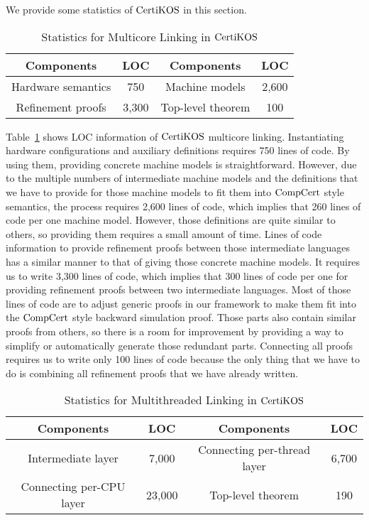 We provide some statistics of $\mathrm{CertiKOS}$ in this section. 
\begin{table}
\begin{center}
\renewcommand{\arraystretch}{1.1}
\setlength{\tabcolsep}{0.3em}
\begin{tabular}{|c|c||c|c|}
\hline
Components  & LOC & Components  & LOC \\
\hline
\hline
Hardware semantics & 750 &
Machine models & 2,600 \\ 
\hline
Refinement proofs & 3,300 & Top-level theorem & 100\\ 
\hline
\end{tabular}
\end{center}
\caption{Statistics for Multicore Linking in $\mathrm{CertiKOS}$}
\label{table:multicore-evaluation}
\hrulefill
\end{table}
Table~\ref{table:multicore-evaluation} shows LOC information of $\mathrm{CertiKOS}$ multicore linking.
Instantiating hardware configurations and auxiliary definitions requires 750 lines of code. 
By using them, providing concrete machine models is straightforward.
However, due to the multiple numbers of intermediate machine models and the definitions that we have to provide for those machine models to fit them into $\mathrm{CompCert}$ style semantics, the process requires 2,600 lines of code, which implies that 260 lines of code per one machine model.
However, those definitions are quite similar to others, so providing them requires a small amount of time. 
Lines of code information to provide refinement proofs between those intermediate languages has a similar manner to that of giving those concrete machine models. 
It requires us to write 3,300 lines of code, which implies that 300 lines of code per one for providing refinement proofs between two intermediate languages. 
Most of those lines of code are to adjust generic proofs in our framework to make them fit into the $\mathrm{CompCert}$ style backward simulation proof. 
Those parts also contain similar proofs from others, so there is a room for improvement by providing a way to simplify or automatically generate those redundant parts. 
Connecting all proofs requires us to write only 100 lines of code because the only thing that we have to do is combining all refinement proofs that we have already written. 
\begin{table}
\begin{center}
\renewcommand{\arraystretch}{1.1}
\setlength{\tabcolsep}{0.3em}
\begin{tabular}{|c|c||c|c|}
\hline
Components  & LOC & Components  & LOC \\
\hline
\hline
Intermediate layer & 7,000 &
Connecting per-thread layer & 6,700 \\ 
\hline
Connecting per-CPU layer & 23,000 & Top-level theorem & 190\\ 
\hline
\end{tabular}
\end{center}
\caption{Statistics for Multithreaded Linking in $\mathrm{CertiKOS}$}
\label{table:multithreaded-evaluation}
\hrulefill
\end{table}
